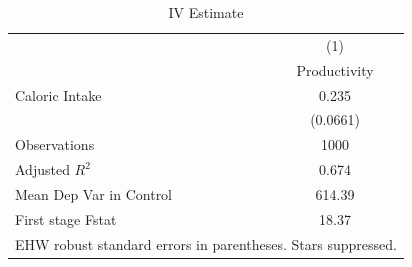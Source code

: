 \begin{table}[htbp]\centering
\caption{IV Estimate}
\begin{tabular}{l*{1}{c}}
\hline\hline
                    &\multicolumn{1}{c}{(1)}\\
                    &\multicolumn{1}{c}{Productivity}\\
\hline
Caloric Intake      &       0.235\\
                    &    (0.0661)\\
\hline
Observations        &        1000\\
Adjusted \(R^{2}\)  &       0.674\\
Mean Dep Var in Control&      614.39\\
First stage Fstat   &       18.37\\
\hline\hline
\multicolumn{2}{l}{\footnotesize EHW robust standard errors in parentheses. Stars suppressed.}\\
\end{tabular}
\end{table}

